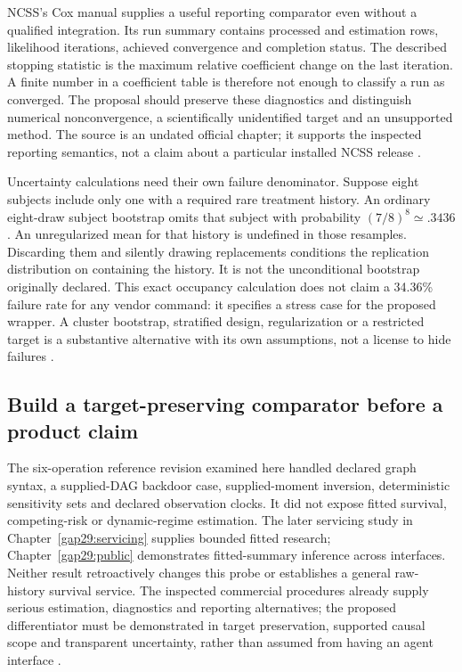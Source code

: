NCSS's Cox manual supplies a useful reporting comparator even without a
qualified integration. Its run summary contains processed and estimation
rows, likelihood iterations, achieved convergence and completion status.
The described stopping statistic is the maximum relative coefficient change
on the last iteration. A finite number in a coefficient table is therefore
not enough to classify a run as converged. The proposal should preserve
these diagnostics and distinguish numerical nonconvergence, a scientifically
unidentified target and an unsupported method. The source is an undated
official chapter; it supports the inspected reporting semantics, not a
claim about a particular installed NCSS release \citep{exec14_survival_ncss}.

Uncertainty calculations need their own failure denominator. Suppose eight
subjects include only one with a required rare treatment history. An ordinary
eight-draw subject bootstrap omits that subject with probability
$(7/8)^8\simeq.3436$. An unregularized mean for that history is undefined in
those resamples. Discarding them and silently drawing replacements conditions
the replication distribution on containing the history. It is not the
unconditional bootstrap originally declared. This exact occupancy calculation
does not claim a 34.36\% failure rate for any vendor command: it specifies a
stress case for the proposed wrapper. A cluster bootstrap, stratified design,
regularization or a restricted target is a substantive alternative with its
own assumptions, not a license to hide failures \citep{exec14_survival_exact}.

\subsection{Build a target-preserving comparator before a product claim}

The six-operation reference revision examined here handled declared graph
syntax, a supplied-DAG backdoor case, supplied-moment inversion, deterministic
sensitivity sets and declared observation clocks. It did not expose fitted
survival, competing-risk or dynamic-regime estimation. The later servicing
study in Chapter~\ref{gap29:servicing} supplies bounded fitted research;
Chapter~\ref{gap29:public} demonstrates fitted-summary inference across
interfaces. Neither result retroactively changes this probe or establishes a
general raw-history survival service. The inspected
commercial procedures already supply serious estimation, diagnostics and
reporting alternatives; the proposed differentiator must be demonstrated in
target preservation, supported causal scope and transparent uncertainty,
rather than assumed from having an agent interface
\citep{exec14_survival_survey}.

